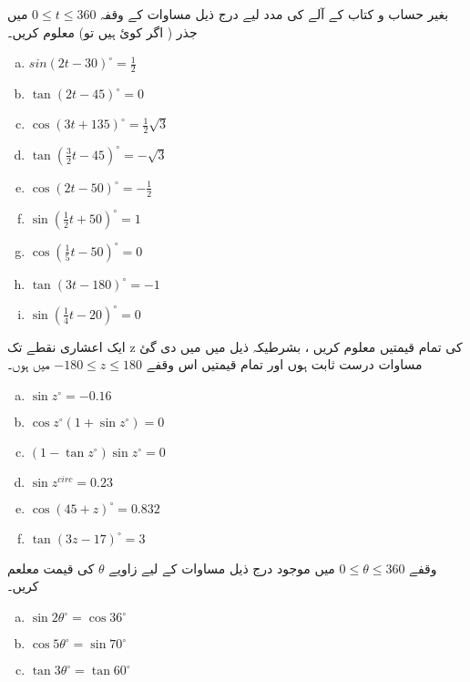  بغیر حساب و کتاب کے آلے کی مدد لیے درج ذیل مساوات کے  وقفہ
\( 0 \leqslant t\leqslant360 \) 
میں جذر ( اگر کوئ ہیں تو) معلوم کریں۔
\begin{multicols}{3}
\begin{enumerate}[a.]
\item \( sin \left(2t-30\right)^{\circ}=\frac{1}{2} \) 
\item \( \tan\left(2t-45\right)^{\circ}= 0 \) 
\item \( \cos\left(3t+135\right)^{\circ}=\frac{1}{2}\sqrt{3} \) 
\item \( \tan\left(\frac{3}{2}t-45\right)^{\circ}=-\sqrt{3} \) 
\item \( \cos \left(2t-50\right)^{\circ}=-\frac{1}{2}  \) 
\item \( \sin\left(\frac{1}{2}t+50\right)^{\circ}=1 \) 
\item \( \cos\left(\frac{1}{5}t-50\right)^{\circ}=0 \) 
\item \( \tan \left(3t-180\right)^{\circ}=-1 \) 
\item \( \sin\left(\frac{1}{4}t-20\right)^{\circ}=0 \) 
\end{enumerate}
\end{multicols}

ایک اعشاری نقطے تک    z    کی تمام قیمتیں معلوم کریں ، بشرطیکہ ذیل میں میں دی گئ مساوات درست ثابت ہوں اور تمام قیمتیں اس وقفے \( -180 \leqslant z \leqslant 180 \) میں ہوں۔


\begin{multicols}{3}
\begin{enumerate}[a.]
\item \( \sin z^{\circ}=-0.16 \) 
\item \( \cos z^{\circ}\left(1+\sin z^{\circ}\right)=0 \) 
\item \( \left(1-\tan z^{\circ}\right)\sin z^{\circ} = 0 \) 
\item \( \sin z^{circ}=0.23 \) 
\item \( \cos\left(45+z\right)^{\circ}=0.832 \) 
\item \( \tan\left(3z-17\right)^{\circ}=3 \) 
\end{enumerate}
\end{multicols}

 
  وقفے   \( 0 \leqslant \theta \leqslant 360 \) میں موجود درج ذیل مساوات کے لیے زاویے \( \theta \) 	کی قیمت معلعم کریں۔%


\begin{multicols}{3}
\begin{enumerate}[a.]
\item \( \sin 2\theta^{\circ}=\cos 36^{\circ} \) 
\item \( \cos 5\theta^{\circ}=\sin 70^{\circ} \) 
\item \( \tan 3\theta^{\circ}=\tan 60^{\circ} \) 
\end{enumerate}
\end{multicols}


